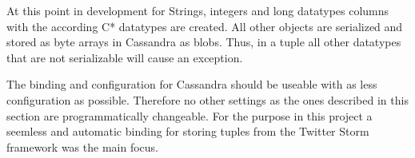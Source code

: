 At this point in development for Strings, integers and long datatypes columns with the according C* datatypes are created. All other objects are serialized and stored as byte arrays in Cassandra as blobs. Thus, in a tuple all other datatypes that are not serializable will cause an exception.

The binding and configuration for Cassandra should be useable with as less configuration as possible. Therefore no other settings as the ones described in this section are programmatically changeable. For the purpose in this project a seemless and automatic binding for storing tuples from the Twitter Storm framework was the main focus.
